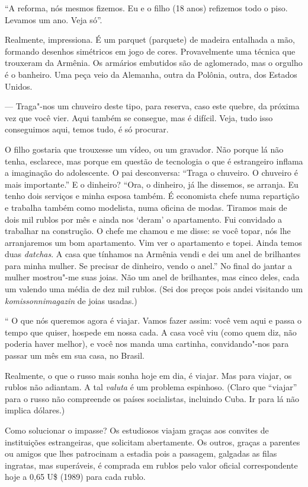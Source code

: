 ``A reforma, nós mesmos fizemos. Eu e o filho (18 anos) refizemos todo o
piso. Levamos um ano. Veja só''.

Realmente, impressiona. É um parquet (parquete) de madeira entalhada a
mão, formando desenhos simétricos em jogo de cores. Provavelmente uma
técnica que trouxeram da Armênia. Os armários embutidos são de
aglomerado, mas o orgulho é o banheiro. Uma peça veio da Alemanha, outra
da Polônia, outra, dos Estados Unidos.

--- Traga"-nos um chuveiro deste tipo, para reserva, caso este quebre, da
próxima vez que você vier. Aqui também se consegue, mas é difícil. Veja,
tudo isso conseguimos aqui, temos tudo, é só procurar.

O filho gostaria que trouxesse um vídeo, ou um gravador. Não porque lá
não tenha, esclarece, mas porque em questão de tecnologia o que é
estrangeiro inflama a imaginação do adolescente. O pai desconversa:
``Traga o chuveiro. O chuveiro é mais importante.'' E o dinheiro? ``Ora,
o dinheiro, já lhe dissemos, se arranja. Eu tenho dois serviços e minha
esposa também. É economista chefe numa repartição e trabalha também como
modelista, numa oficina de modas. Tiramos mais de dois mil rublos por
mês e ainda nos `deram' o apartamento. Fui convidado a trabalhar na
construção. O chefe me chamou e me disse: se você topar, nós lhe
arranjaremos um bom apartamento. Vim ver o apartamento e topei. Ainda
temos duas \emph{datchas}. A casa que tínhamos na Armênia vendi e dei um
anel de brilhantes para minha mulher. Se precisar de dinheiro, vendo o
anel.'' No final do jantar a mulher mostrou"-me suas joias. Não um anel
de brilhantes, mas cinco deles, cada um valendo uma média de dez mil
rublos. (Sei dos preços pois andei visitando um \emph{komissonnimagazin}
de joias usadas.)

`` O que nós queremos agora é viajar. Vamos fazer assim: você vem aqui e
passa o tempo que quiser, hospede em nossa cada. A casa você viu (como
quem diz, não poderia haver melhor), e você nos manda uma cartinha,
convidando"-nos para passar um mês em sua casa, no Brasil.

Realmente, o que o russo mais sonha hoje em dia, é viajar. Mas para
viajar, os rublos não adiantam. A tal \emph{valuta} é um problema
espinhoso. (Claro que ``viajar'' para o russo não compreende os países
socialistas, incluindo Cuba. Ir para lá não implica dólares.)

Como solucionar o impasse? Os estudiosos viajam graças aos convites de
instituições estrangeiras, que solicitam abertamente. Os outros, graças
a parentes ou amigos que lhes patrocinam a estadia pois a passagem,
galgadas as filas ingratas, mas superáveis, é comprada em rublos pelo
valor oficial correspondente hoje a 0,65 U\$ (1989) para cada rublo.

